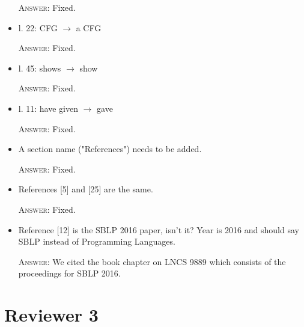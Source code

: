 \documentclass{article}
\begin{document}
\begin{itemize}
    \textsc{Answer}: Fixed.

    \item l. 22: CFG $\to$ a CFG

    \textsc{Answer}: Fixed.

    \item l. 45: shows $\to$ show

    \textsc{Answer}: Fixed.

    \item l. 11: have given $\to$ gave

    \textsc{Answer}: Fixed.

    \item A section name ("References") needs to be added.

    \textsc{Answer}: Fixed.

    \item References [5] and [25] are the same.

    \textsc{Answer}: Fixed.

    \item Reference [12] is the SBLP 2016 paper, isn't it? Year is 2016 and should say SBLP instead of Programming Languages.

    \textsc{Answer}: We cited the book chapter on LNCS 9889 which consists of the proceedings for SBLP 2016. 
        
\end{itemize}

\section*{Reviewer 3}
\end{document}
